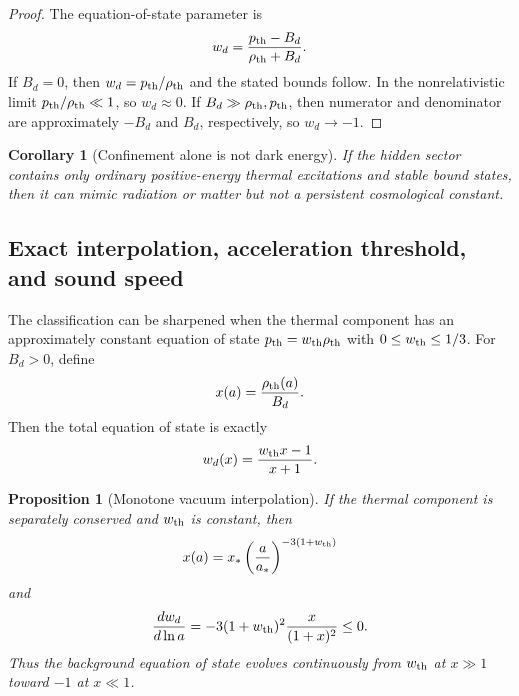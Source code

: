 \documentclass[11pt]{article}
\newtheorem{proposition}{Proposition}
\newtheorem{corollary}{Corollary}
\theoremstyle{remark}
\begin{document}
\begin{proof}
The equation-of-state parameter is
\begin{equation}
w_d=\frac{p_{\rm th}-B_d}{\rho_{\rm th}+B_d}.
\end{equation}
If $B_d=0$, then $w_d=p_{\rm th}/\rho_{\rm th}$ and the stated bounds follow. In the nonrelativistic limit $p_{\rm th}/\rho_{\rm th}\ll1$, so $w_d\approx0$. If $B_d\gg\rho_{\rm th},p_{\rm th}$, then numerator and denominator are approximately $-B_d$ and $B_d$, respectively, so $w_d\to-1$.
\end{proof}

\begin{corollary}[Confinement alone is not dark energy]
If the hidden sector contains only ordinary positive-energy thermal excitations and stable bound states, then it can mimic radiation or matter but not a persistent cosmological constant.
\end{corollary}


\subsection{Exact interpolation, acceleration threshold, and sound speed}
The classification can be sharpened when the thermal component has an approximately constant equation of state $p_{\rm th}=w_{\rm th}\rho_{\rm th}$ with $0\le w_{\rm th}\le 1/3$. For $B_d>0$, define
\begin{equation}
 x(a)=\frac{\rho_{\rm th}(a)}{B_d}.
\end{equation}
Then the total equation of state is exactly
\begin{equation}
 w_d(x)=\frac{w_{\rm th}x-1}{x+1}.
 \label{eq:hidden-wx}
\end{equation}

\begin{proposition}[Monotone vacuum interpolation]
If the thermal component is separately conserved and $w_{\rm th}$ is constant, then
\begin{equation}
 x(a)=x_*\left(\frac{a}{a_*}\right)^{-3(1+w_{\rm th})}
\end{equation}
and
\begin{equation}
 \frac{dw_d}{d\ln a}
 =-3(1+w_{\rm th})^2\frac{x}{(1+x)^2}\le0.
 \label{eq:hidden-w-monotone}
\end{equation}
Thus the background equation of state evolves continuously from $w_{\rm th}$ at $x\gg1$ toward $-1$ at $x\ll1$.
\end{proposition}
\end{document}
